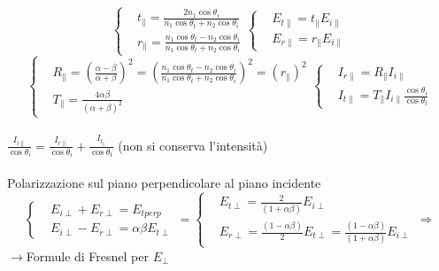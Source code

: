 \documentclass[a4paper]{article}
\begin{document}
\begin{itemize}
\begin{equation*}
\end{equation*}
\begin{equation*}
	\begin{cases}
		&t_\parallel=\frac{2n_1\cos\theta_i}{n_1 \cos \theta_t + n_2 \cos \theta_i}\\
		&r_\parallel=\frac{n_1 \cos \theta_t-n_2 \cos \theta_i}{n_1 \cos \theta_t+n_2 \cos \theta_i}
	\end{cases}
	\begin{cases}
		&E_{t\parallel}=t_\parallel E_{i\parallel}\\
		&E_{r\parallel}=r_\parallel E_{i\parallel}
	\end{cases}
\end{equation*}
\begin{equation*}
	\begin{cases}
		&R_\parallel=(\frac{\alpha-\beta}{\alpha+\beta})^2=(\frac{n_1 \cos \theta_t-n_2 \cos \theta_i}{n_1 \cos \theta_t+n_2 \cos \theta_i})^2=(r_\parallel)^2\\
		&T_\parallel=\frac{4\alpha \beta}{(\alpha+\beta)^2}
	\end{cases} 
	\begin{cases}
		&I_{r\parallel}=R_\parallel I_{i\parallel}\\
		&I_{t\parallel}=T_\parallel I_{i\parallel}\frac{\cos \theta_i}{\cos\theta_t}
	\end{cases}
\end{equation*}\\
$\frac{I_{i\parallel}}{\cos\theta_i}=\frac{I_{r\parallel}}{\cos \theta_i}+\frac{I_{t_\parallel}}{\cos \theta_t}$ (non si conserva l'intensità)\\ \\
Polarizzazione sul piano perpendicolare al piano incidente
\begin{equation*}
	\begin{cases}
		& E_{i \perp}+E_{r \perp  }= E_{t perp}\\
		& E_{i \perp}-E_{r \perp  }=\alpha \beta E_{t \perp}
	\end{cases}=
	\begin{cases}
		& E_{t\perp}=\frac{2}{(1+\alpha\beta)}E_{i\perp}\\
		& E_{r\perp}=\frac{(1- \alpha \beta) }{2}E_{t\perp}=\frac{(1- \alpha \beta)}{(1+ \alpha \beta)}E_{i\perp}
	\end{cases}\Rightarrow
\end{equation*}
$\rightarrow$Formule di Fresnel per $E_\perp$\\
\begin{equation*}

\end{equation*}
\end{itemize}
\end{document}
